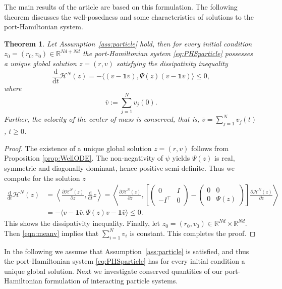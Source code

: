 \documentclass[11pt]{article}
\newtheorem{theorem}{Theorem}[section]
\newcommand{\R}[0]{\mathbb R}
\newcommand{\calH}[0]{\mathcal H}
\newcommand{\dd}[0]{\mathrm d}
\begin{document}
\begin{bibunit}[abbrv]
The main results of the article are based on this formulation. The following theorem discusses the well-posedness and some characteristics of solutions to the port-Hamiltonian system.
%
\begin{theorem}\label{thm:existencenew}
Let Assumption~\ref{ass:particle}  hold, then for every initial condition $z_0=(r_0,v_0)\in \R^{Nd+Nd}$ the port-Hamiltonian system \eqref{eq:PHSparticle} possesses a unique global solution $z=(r,v)$ satisfying the dissipativity inequality
\begin{equation}\label{eqn:dissipnew}
\frac{\dd}{\dd t} \calH^N(z)= - \langle (v - \textbf{1}\bar v), \Psi(z) (v-\textbf{1}\bar v) \rangle \le 0,
\end{equation}
where 
\begin{equation*}
  \bar v:=\sum_{j=1}^N v_j(0). 
\end{equation*}
Further, the velocity of the center of mass is conserved, that is,
 $ \bar v=\sum_{j=1}^N v_j(t)$, $t\ge 0$. 
\end{theorem}
\begin{proof}
The existence of a unique global solution $z=(r,v)$ follows from Proposition \ref{prop:WellODE}.
The non-negativity of $\psi$ yields $\Psi(z)$ is real, symmetric and diagonally dominant, hence positive semi-definite.
%
Thus we compute for the solution $z$
\begin{align*}
    \frac{\dd}{\dd t}\calH^N(z) &= \left\langle \frac{\partial \calH^N(z)}{\partial z} , \frac{\dd}{\dd t} z \right\rangle = \left\langle \frac{\partial \calH^N(z)}{\partial z} , \left[ \begin{pmatrix} 0 & I \\ -I^\top & 0 \end{pmatrix} - \begin{pmatrix} 0 & 0 \\ 0 & \Psi(z) \end{pmatrix} \right] \frac{\partial \calH^N(z)}{\partial z}  \right\rangle\\
    &= - \langle v - \textbf{1}\bar v, \Psi(z) v - \textbf{1}\bar v\rangle \le 0.
\end{align*}
This shows the dissipativity inequality. 
Finally, let $z_0=(r_0,v_0)\in \R^{Nd}\times \R^{Nd}$. Then \eqref{eqn:meanv} implies that $\sum_{i=1}^N v_i$ is constant. This completes the proof.
\end{proof}

In the following we assume that Assumption~\ref{ass:particle}  is satisfied, and thus the port-Hamiltonian system \eqref{eq:PHSparticle} has for every initial condition a unique global solution. Next we investigate  conserved quantities of our port-Hamiltonian formulation of interacting particle systems. 


\end{bibunit}
\end{document}
